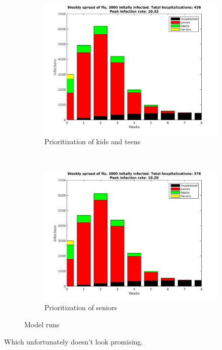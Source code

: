 \documentclass{article}
\begin{document}
\begin{figure}[h!]
\begin{subfigure}[b]{0.5\textwidth}
		\centering
		\includegraphics[width=\textwidth]{figures/Weekly-juniors.png}
		\caption{Prioritization of kids and teens}
	\end{subfigure}~
	\begin{subfigure}[b]{0.5\textwidth}
		\centering
		\includegraphics[width=\textwidth]{figures/Weekly-seniors.png}
		\caption{Prioritization of seniors}
	\end{subfigure}
	\caption{Model runs}
	\label{fig:modelout}
\end{figure}

Which unfortunately doesn't look promising.
\end{document}
